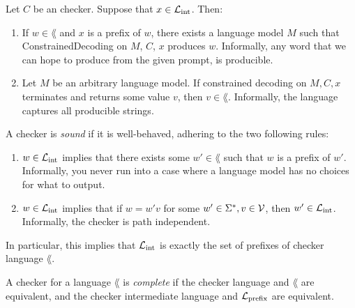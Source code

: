 \begin{theorem}
    \label{def:CheckerLanguageCorrect}
    Let $C$ be an checker. Suppose that $x \in \mathcal{L}_{\mathrm{int}}$. Then: 
    \begin{enumerate}
        \item If $w \in \lang$ and $x$ is a prefix of $w$, there exists a language model $M$ such that ConstrainedDecoding on $M$, $C$, $x$ produces $w$. Informally, any word that we can hope to produce from the given prompt, is producible.
        \item Let $M$ be an arbitrary language model. If constrained decoding on $M, C, x$ terminates and returns some value $v$, then $v \in \lang$. Informally, the language captures all producible strings.
    \end{enumerate}
\end{theorem}

\begin{definition}
    \label{def:CheckerSound}
    A checker is \emph{sound} if it is well-behaved, adhering to the two following rules:

    \begin{enumerate}
        \item $w \in \mathcal{L}_{\mathrm{int}}$ implies that there exists some $w' \in \lang$ such that $w$ is a prefix of $w'$. Informally, you never run into a case where a language model has no choices for what to output.
        \item $w \in \mathcal{L}_{\mathrm{int}}$ implies that if $w = w'v$ for some $w' \in \Sigma^*, v \in \mathcal{V}$, then $w' \in \mathcal{L}_{\mathrm{int}}$. Informally, the checker is path independent.
    \end{enumerate}

    In particular, this implies that $\mathcal{L}_{\mathrm{int}}$ is exactly the set of prefixes of checker language $\lang$.
\end{definition}

\begin{definition}
    \label{def:CheckerComplete}
    A checker for a language $\lang$ is \emph{complete} if the checker language and $\lang$ are equivalent, and the checker intermediate language and $\mathcal{L}_{\mathrm{prefix}}$ are equivalent. 
\end{definition}


